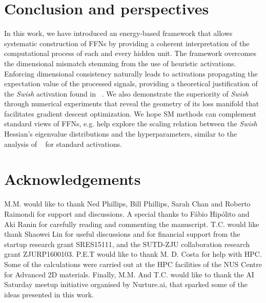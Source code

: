 \documentclass{article}
\begin{document}
\section{Conclusion and perspectives}
%
In this work, we have introduced an energy-based framework that allows systematic construction of FFNs by providing a coherent interpretation of the computational process of each and every hidden unit. The framework overcomes the dimensional mismatch stemming from the use of heuristic activations. Enforcing dimensional consistency naturally leads to activations propagating the expectation value of the processed signals, providing a theoretical justification of the \textit{Swish} activation found in ~\cite{prajit}. We also demonstrate the superiority of {\it Swish} through numerical experiments that reveal the geometry of its loss manifold that facilitates gradient descent optimization. We hope SM methods can complement standard views of FFNs, e.g. help explore the scaling relation between the {\it Swish} Hessian's eigenvalue distributions and the hyperparameters, similar to the analysis of ~\cite{penn1} for standard activations.

\section{Acknowledgements}

M.M. would like to thank Ned Phillips, Bill Phillips, Sarah Chan and Roberto Raimondi for support and discussions. A special thanks to  F\'abio Hip\'olito and Aki Ranin for carefully reading and commenting the manuscript. T.C. would like thank Shaowei Lin for useful discussions and for financial support from the startup research grant
SRES15111, and the SUTD-ZJU collaboration research\\
grant ZJURP1600103. P.E.T would like to thank M. D. Costa for help with HPC. Some of the calculations were carried out at the HPC facilities of the NUS Centre for Advanced 2D materials. Finally, M.M. And T.C. would like to thank the AI Saturday meetup initiative organised by Nurture.ai, that sparked some of the ideas presented in this work.

\appendix
\end{document}
